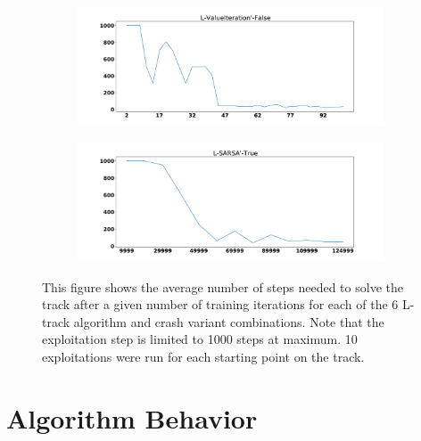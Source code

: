 \documentclass{amsart}
\begin{document}
\begin{figure}
\begin{subfigure}[t]{0.3\textwidth}
    \end{subfigure}
    \begin{subfigure}[t]{0.3\textwidth}
    \centering
    \includegraphics[width=\textwidth]{Ltrack_1_learning_rate.pdf}
    \end{subfigure}
    \begin{subfigure}[t]{0.3\textwidth}
    \centering
    \includegraphics[width=\textwidth]{Ltrack_4_learning_rate.pdf}
    \end{subfigure}
    \caption{This figure shows the average number of steps needed to solve the track after a given number of
    training iterations for each of the 6 L-track algorithm and crash variant combinations. Note that the exploitation
    step is limited to 1000 steps at maximum. 10 exploitations were run for each starting point on the track.}
    \end{figure}

    \section{Algorithm Behavior}



\end{document}
